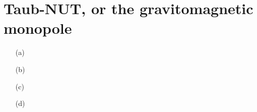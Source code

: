 \documentclass[10pt, a4paper]{article}
\begin{document}
{\begin{enumerate}
\end{enumerate}

\section{Taub-NUT, or the gravitomagnetic monopole}
\begin{enumerate}
  \item[(a)]
  \item[(b)]
  \item[(c)]
  \item[(d)]
\end{enumerate}

}

\makereferences


\end{document}
